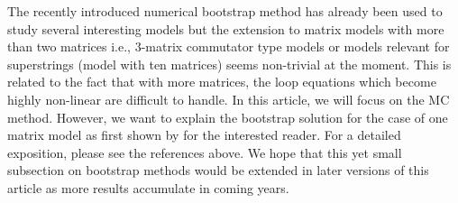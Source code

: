 \documentclass[letter,11pt]{article}
\begin{document}
The recently introduced numerical bootstrap method has already been used to study several interesting models \cite{Anderson:2016rcw,Lin:2020mme,Han:2020bkb,Kazakov:2021lel,Berenstein:2021dyf,Bhattacharya:2021btd,Du:2021hfw} but the extension to matrix models with more than two matrices i.e., 3-matrix commutator type models or models relevant for superstrings (model with ten matrices) seems non-trivial at the moment. This is related to the fact that with more matrices, the loop equations which become highly non-linear are difficult to handle. In this article, we will focus on the MC method. However, we want to explain the bootstrap solution for the case of one matrix model as first shown by \cite{Lin:2020mme} for the interested reader. For a detailed exposition, please see the references above. We hope that this yet small subsection on bootstrap methods would be extended in later versions of this article as more results accumulate in coming years. 
\end{document}
